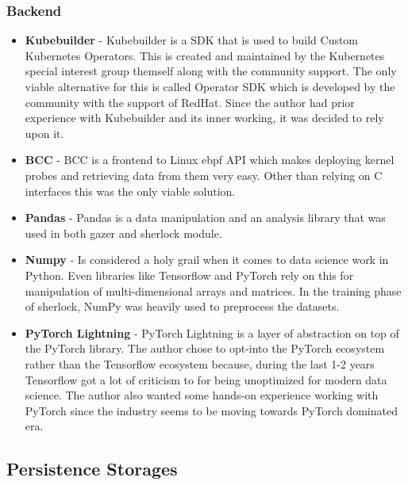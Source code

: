 \subsubsection{Backend}
\begin{itemize}
    \item \textbf{Kubebuilder} - Kubebuilder is a SDK that is used to build Custom Kubernetes Operators. This is created and maintained by the Kubernetes special interest group themself along with the community support. The only viable alternative for this is called Operator SDK which is developed by the community with the support of RedHat. Since the author had prior experience with Kubebuilder and its inner working, it was decided to rely upon it.
    \item \textbf{BCC} - BCC is a frontend to Linux \ac{ebpf} API which makes deploying kernel probes and retrieving data from them very easy. Other than relying on C interfaces this was the only viable solution. 
    \item \textbf{Pandas} - Pandas is a data manipulation and an analysis library that was used in both \ac{gazer} and \ac{sherlock} module.
    \item \textbf{Numpy} - Is considered a holy grail when it comes to data science work in Python. Even libraries like Tensorflow and PyTorch rely on this for manipulation of multi-dimensional arrays and matrices. In the training phase of \ac{sherlock}, NumPy was heavily used to preprocess the datasets.
    \item \textbf{PyTorch Lightning} - PyTorch Lightning is a layer of abstraction on top of the PyTorch library. The author chose to opt-into the PyTorch ecosystem rather than the Tensorflow ecosystem because, during the last 1-2 years Tensorflow got a lot of criticism to for being unoptimized for modern data science. The author also wanted some hands-on experience working with PyTorch since the industry seems to be moving towards PyTorch dominated era.
\end{itemize}

\subsection{Persistence Storages}

